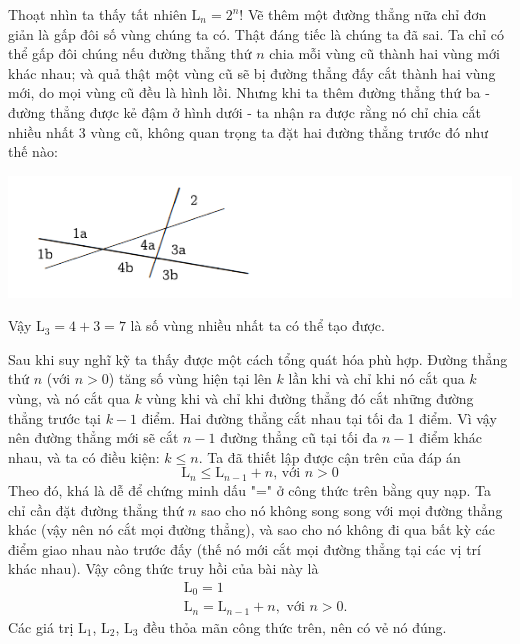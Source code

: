Thoạt nhìn ta thấy tất nhiên $\mathrm{L}_n = 2^n$! Vẽ thêm một đường thẳng nữa chỉ đơn giản là gấp đôi số vùng chúng ta có. Thật đáng tiếc là chúng ta đã sai. Ta chỉ có thể gấp đôi chúng nếu đường thẳng thứ $n$ chia mỗi vùng cũ thành hai vùng mới khác nhau; và quả thật một vùng cũ sẽ bị đường thẳng đấy cắt thành hai vùng mới, do mọi vùng cũ đều là hình lồi. 
Nhưng khi ta thêm đường thẳng thứ ba - đường thẳng được kẻ đậm ở hình dưới - ta nhận ra được rằng nó chỉ chia cắt nhiều nhất 3 vùng cũ, không quan trọng ta đặt hai đường thẳng trước đó như thế nào:
\begin{center}
    \includegraphics[width=1\textwidth]{assets/chapter1/split_region.png}
\end{center}
Vậy $\mathrm{L}_3 = 4 + 3 = 7$ là số vùng nhiều nhất ta có thể tạo được.

Sau khi suy nghĩ kỹ ta thấy được một cách tổng quát hóa phù hợp. Đường thẳng thứ $n$ (với $n > 0$) tăng số vùng hiện tại lên $k$ lần khi và chỉ khi nó cắt qua $k$ vùng, và nó cắt qua $k$ vùng khi và chỉ khi đường thẳng đó cắt những đường thẳng trước tại $k - 1$ điểm. Hai đường thẳng cắt nhau tại tối đa 1 điểm. Vì vậy nên đường thẳng mới sẽ cắt $n - 1$ đường thẳng cũ tại tối đa $n - 1$ điểm khác nhau, và ta có điều kiện: $k \leq n$. Ta đã thiết lập được cận trên của đáp án
$$\mathrm{L}_n \leq \mathrm{L}_{n - 1} + n \text{, \ \ \ \ với } n > 0$$
Theo đó, khá là dễ để chứng minh dấu "=" ở công thức trên bằng quy nạp. Ta chỉ cần đặt đường thẳng thứ $n$ sao cho nó không song song với mọi đường thẳng khác (vậy nên nó cắt mọi đường thẳng), và sao cho nó không đi qua bất kỳ các điểm giao nhau nào trước đấy (thế nó mới cắt mọi đường thẳng tại các vị trí khác nhau). Vậy công thức truy hồi của bài này là
\begin{equation}\label{1.4}
    \begin{aligned}
        & \mathrm{L}_0 = 1 \\
        & \mathrm{L}_n = \mathrm{L}_{n - 1} + n, \text{ \ \ \ \ với } n > 0.
    \end{aligned}
\end{equation}
Các giá trị $\mathrm{L}_1$, $\mathrm{L}_2$, $\mathrm{L}_3$ đều thỏa mãn công thức trên, nên có vẻ nó đúng.

